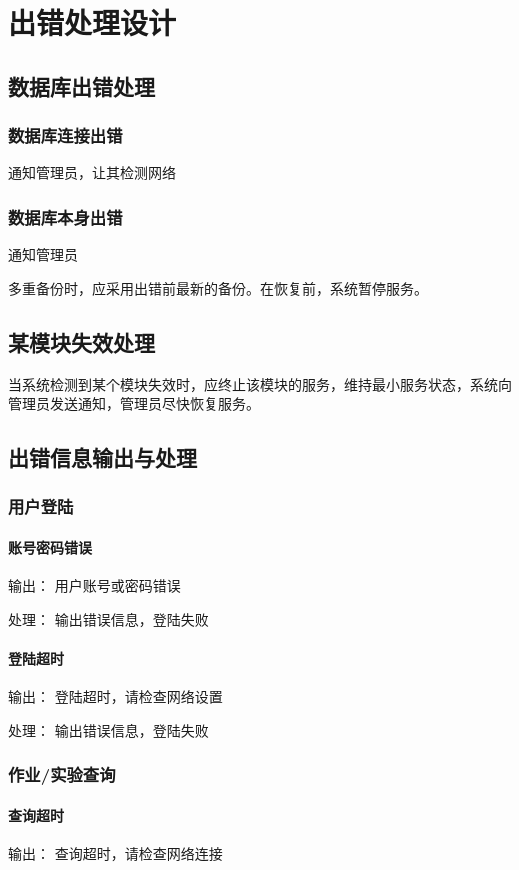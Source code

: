 \chapter{出错处理设计}
\section{数据库出错处理}
\subsection{数据库连接出错}
通知管理员，让其检测网络

\subsection{数据库本身出错}
通知管理员

多重备份时，应采用出错前最新的备份。在恢复前，系统暂停服务。



\section{某模块失效处理}

当系统检测到某个模块失效时，应终止该模块的服务，维持最小服务状态，系统向管理员发送通知，管理员尽快恢复服务。

\section{出错信息输出与处理}
\subsection{用户登陆}
\subsubsection{账号密码错误}
输出： 用户账号或密码错误

处理： 输出错误信息，登陆失败
\subsubsection{登陆超时}
输出： 登陆超时，请检查网络设置

处理： 输出错误信息，登陆失败

\subsection{作业/实验查询}
\subsubsection{查询超时}
输出： 查询超时，请检查网络连接

